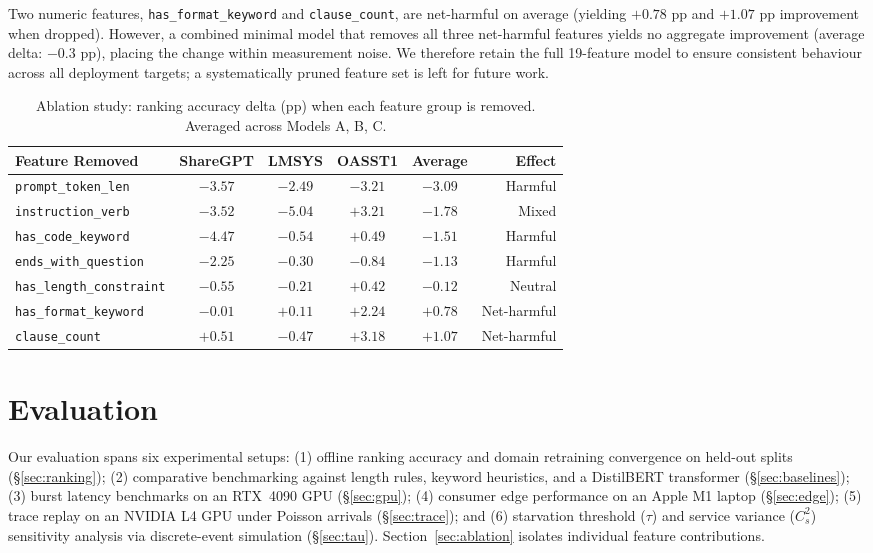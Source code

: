 \documentclass[10pt]{article}
\begin{document}
Two numeric features, \texttt{has\_format\_keyword} and \texttt{clause\_count}, are net-harmful on average (yielding $+0.78$ pp and $+1.07$ pp improvement when dropped). However, a combined minimal model that removes all three net-harmful features yields no aggregate improvement (average delta: $-0.3$ pp), placing the change within measurement noise. We therefore retain the full 19-feature model to ensure consistent behaviour across all deployment targets; a systematically pruned feature set is left for future work.

\begin{table}[H]
\centering
\caption{Ablation study: ranking accuracy delta (pp) when each feature group is removed. Averaged across Models A, B, C.}
\label{tab:ablation}
\small
\begin{tabular}{lccccr}
\toprule
Feature Removed & ShareGPT & LMSYS & OASST1 & Average & Effect \\
\midrule
\texttt{prompt\_token\_len} & $-3.57$ & $-2.49$ & $-3.21$ & $-3.09$ & Harmful \\
\texttt{instruction\_verb} & $-3.52$ & $-5.04$ & $+3.21$ & $-1.78$ & Mixed \\
\texttt{has\_code\_keyword} & $-4.47$ & $-0.54$ & $+0.49$ & $-1.51$ & Harmful \\
\texttt{ends\_with\_question} & $-2.25$ & $-0.30$ & $-0.84$ & $-1.13$ & Harmful \\
\texttt{has\_length\_constraint} & $-0.55$ & $-0.21$ & $+0.42$ & $-0.12$ & Neutral \\
\texttt{has\_format\_keyword} & $-0.01$ & $+0.11$ & $+2.24$ & $+0.78$ & Net-harmful \\
\texttt{clause\_count} & $+0.51$ & $-0.47$ & $+3.18$ & $+1.07$ & Net-harmful \\
\bottomrule
\end{tabular}
\end{table}

\section{Evaluation}
\label{sec:eval}

Our evaluation spans six experimental setups: (1) offline ranking accuracy and domain retraining convergence on held-out splits (\S\ref{sec:ranking}); (2) comparative benchmarking against length rules, keyword heuristics, and a DistilBERT transformer (\S\ref{sec:baselines}); (3) burst latency benchmarks on an RTX~4090 GPU (\S\ref{sec:gpu}); (4) consumer edge performance on an Apple M1 laptop (\S\ref{sec:edge}); (5) trace replay on an NVIDIA L4 GPU under Poisson arrivals (\S\ref{sec:trace}); and (6) starvation threshold ($\tau$) and service variance ($C_s^2$) sensitivity analysis via discrete-event simulation (\S\ref{sec:tau}). Section~\ref{sec:ablation} isolates individual feature contributions.
\end{document}
